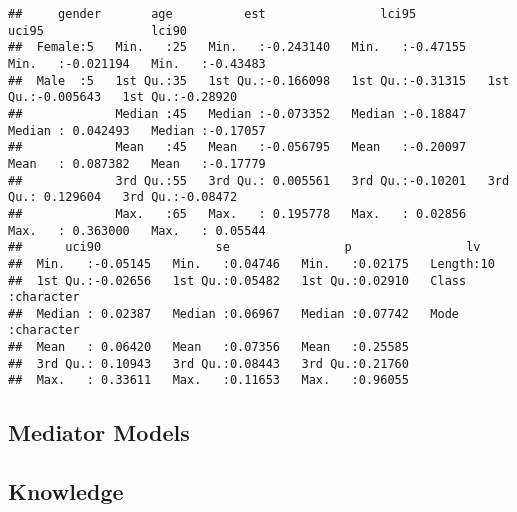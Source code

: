 \documentclass[
]{article}
\begin{document}
\begin{verbatim}
##     gender       age          est                lci95              uci95               lci90         
##  Female:5   Min.   :25   Min.   :-0.243140   Min.   :-0.47155   Min.   :-0.021194   Min.   :-0.43483  
##  Male  :5   1st Qu.:35   1st Qu.:-0.166098   1st Qu.:-0.31315   1st Qu.:-0.005643   1st Qu.:-0.28920  
##             Median :45   Median :-0.073352   Median :-0.18847   Median : 0.042493   Median :-0.17057  
##             Mean   :45   Mean   :-0.056795   Mean   :-0.20097   Mean   : 0.087382   Mean   :-0.17779  
##             3rd Qu.:55   3rd Qu.: 0.005561   3rd Qu.:-0.10201   3rd Qu.: 0.129604   3rd Qu.:-0.08472  
##             Max.   :65   Max.   : 0.195778   Max.   : 0.02856   Max.   : 0.363000   Max.   : 0.05544  
##      uci90                se                p                lv           
##  Min.   :-0.05145   Min.   :0.04746   Min.   :0.02175   Length:10         
##  1st Qu.:-0.02656   1st Qu.:0.05482   1st Qu.:0.02910   Class :character  
##  Median : 0.02387   Median :0.06967   Median :0.07742   Mode  :character  
##  Mean   : 0.06420   Mean   :0.07356   Mean   :0.25585                     
##  3rd Qu.: 0.10943   3rd Qu.:0.08443   3rd Qu.:0.21760                     
##  Max.   : 0.33611   Max.   :0.11653   Max.   :0.96055
\end{verbatim}

\hypertarget{mediator-models}{%
\subsection{Mediator Models}\label{mediator-models}}

\hypertarget{knowledge}{%
\subsection{Knowledge}\label{knowledge}}
\end{document}
